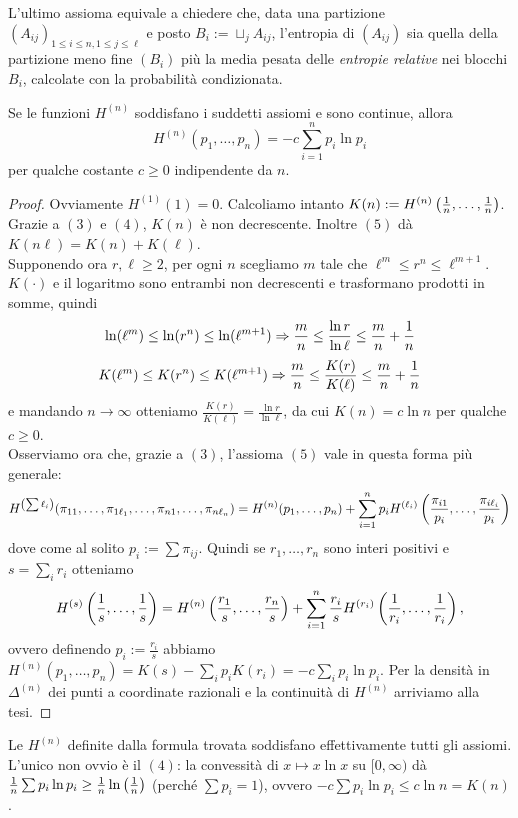 L'ultimo assioma equivale a chiedere che, data una partizione $(A_{ij})_{1\le i\le n,1\le j\le\ell}$
e posto $B_i:=\sqcup_j A_{ij}$, l'entropia di $(A_{ij})$ sia quella della partizione meno fine $(B_i)$
più la media pesata delle \emph{entropie relative} nei blocchi $B_i$, calcolate con la probabilità condizionata.

\begin{teo}Se le funzioni $H^{(n)}$ soddisfano i suddetti assiomi e sono continue, allora
\[ H^{(n)}(p_1,\dots,p_n)=-c\sum_{i=1}^n p_i\ln p_i \]
per qualche costante $c\ge 0$ indipendente da $n$.
\end{teo}

\begin{proof}Ovviamente $H^{(1)}(1)=0$. Calcoliamo intanto
$K(n):=H^{(n)}\left(\frac{1}{n},\dots,\frac{1}{n}\right)$. \\
Grazie a $(3)$ e $(4)$, $K(n)$ è non decrescente. Inoltre $(5)$ dà $K(n\ell)=K(n)+K(\ell)$. \\
Supponendo ora $r,\ell\ge 2$, per ogni $n$ scegliamo $m$ tale che $\ell^m\le r^n\le\ell^{m+1}$.
$K(\cdot)$ e il logaritmo sono entrambi non decrescenti e trasformano prodotti in somme, quindi
\[ \ln(\ell^m)\le\ln(r^n)\le\ln(\ell^{m+1})\Rightarrow \frac{m}{n}\le\frac{\ln r}{\ln \ell}\le\frac{m}{n}+\frac{1}{n} \]
\[ K(\ell^m)\le K(r^n)\le K(\ell^{m+1})\Rightarrow \frac{m}{n}\le\frac{K(r)}{K(\ell)}\le\frac{m}{n}+\frac{1}{n} \]
e mandando $n\to\infty$ otteniamo $\frac{K(r)}{K(\ell)}=\frac{\ln r}{\ln \ell}$, da cui $K(n)=c\ln n$ per qualche $c\ge 0$. \\
Osserviamo ora che, grazie a $(3)$, l'assioma $(5)$ vale in questa forma più generale:
\[ H^{\left(\sum \ell_i\right)}(\pi_{11},\dots,\pi_{1\ell_1},\dots,\pi_{n1},\dots,\pi_{n\ell_n})
=H^{(n)}(p_1,\dots,p_n)+\sum_{i=1}^n p_i H^{(\ell_i)}\left(\frac{\pi_{i1}}{p_i},\dots,\frac{\pi_{i\ell_i}}{p_i}\right) \]
dove come al solito $p_i:=\sum \pi_{ij}$. Quindi se $r_1,\dots,r_n$ sono interi positivi e $s=\sum_i r_i$ otteniamo
\[ H^{(s)}\left(\frac{1}{s},\dots,\frac{1}{s}\right)=H^{(n)}\left(\frac{r_1}{s},\dots,\frac{r_n}{s}\right)
+\sum_{i=1}^n \frac{r_i}{s}H^{(r_i)}\left(\frac{1}{r_i},\dots,\frac{1}{r_i}\right), \]
ovvero definendo $p_i:=\frac{r_i}{s}$ abbiamo $H^{(n)}(p_1,\dots,p_n)=K(s)-\sum_i p_i K(r_i)=-c\sum_i p_i\ln p_i$.
Per la densità in $\Delta^{(n)}$ dei punti a coordinate razionali e la continuità di $H^{(n)}$ arriviamo alla tesi.
\end{proof}

\begin{oss}Le $H^{(n)}$ definite dalla formula trovata soddisfano effettivamente tutti gli assiomi.
L'unico non ovvio è il $(4)$: la convessità di $x\mapsto x\ln x$ su $[0,\infty)$ dà
$\frac{1}{n}\sum p_i\ln p_i\ge\frac{1}{n}\ln\left(\frac{1}{n}\right)$ (perché $\sum p_i=1$), ovvero
$-c\sum p_i\ln p_i\le c\ln n=K(n)$.
\end{oss}

